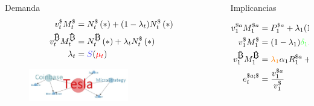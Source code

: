 \begin{frame}[plain]
\begin{columns}
\begin{column}{0.50\textwidth}
    
    \begin{block}{\textcolor{dgreen}{Demanda}}
        \vspace{-10pt}
            \tiny
              \begin{align*}
              v_{t}^{\$}{M_{t}^{\$}}&={N_{t}^{\$}\left(*\right)}+(1-\lambda_t){N_{t}^{\$}\left(*\right)}\\
              v_{t}^{\bitcoinA}{M_{t}^{\bitcoinA}}&={N_{t}^{\bitcoinA}\left(*\right)+\lambda_tN_{t}^{\$}\left(*\right)}\\
              \lambda_t&=\textcolor{blue!70}{S}(\textcolor{red}{\mu_t})
            \end{align*}
    \vspace{-20pt}
            \begin{figure}[t!]
            \begin{center}
            \includegraphics[width=0.6\textwidth]{images/C3/c3_simul_influ3.jpg}
             \end{center}
            \end{figure}
            
    \end{block}
    \end{column}
    
    \begin{column}{0.55\textwidth}
    
    
    \begin{block}{Implicancias}
    \tiny

    \begin{align*}
    v^{\$a}_1 M^{\$a}_1&=P_1^{{\$a}} + \lambda_1 (1-\alpha_1) R_1^{{\$a}} + (1-\lambda_1) \textcolor{blue!60}{\rho_1}  R_1^{{\$a}}\\
    v_1^{\$} M_1^{\$}&=(1-\lambda_1) \textcolor{green!70}{\delta_1} R_1^{\$a}\\
    v_1^{\bitcoinA} M_1^{\bitcoinA}&=\textcolor{orange}{\lambda_1}  \alpha_1 R_1^{\$a} + (1-\lambda_1) \textcolor{red}{\beta_1} R_1^{\$a}\\
    e_t^{{\$a};{\$}}&=\frac{v_1^{\$a}}{v_1^{\$}}
    \end{align*}
    

\end{block}
\end{column}
\end{columns}
\end{frame}
